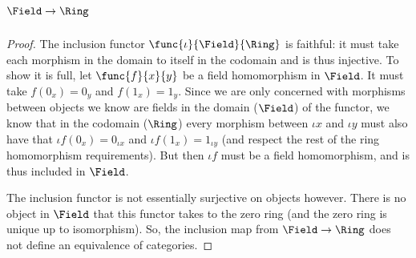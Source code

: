 \documentclass[main.tex]{subfiles}
\begin{document}
\subparagraph{\(\Field\to\Ring\)}
\begin{proof}
	The inclusion functor $\func{\iota}{\Field}{\Ring}$ is faithful: it must
	take each morphism in the domain to itself in the codomain and is thus
	injective. To show it is full, let $\func{f}{x}{y}$ be a field homomorphism
	in $\Field$. It must take $f(0_x)=0_y$ and $f(1_x)=1_y$. Since we are only
	concerned with morphisms between objects we know are fields in the domain
	($\Field$) of the functor, we know that in the codomain ($\Ring$) every
	morphism between $\iota x$ and $\iota y$ must also have that $\iota f(0_x) =
	0_{\iota x}$ and $\iota f(1_x) = 1_{\iota y}$ (and respect the rest of the
	ring homomorphism requirements). But then $\iota f$ must be a field
	homomorphism, and is thus included in $\Field$.

	The inclusion functor is not essentially surjective on objects however. There
	is no object in $\Field$ that this functor takes to the zero ring (and the
	zero ring is unique up to isomorphism). So, the inclusion map from
	$\Field\to\Ring$ does not define an equivalence of categories.
\end{proof}
\end{document}
